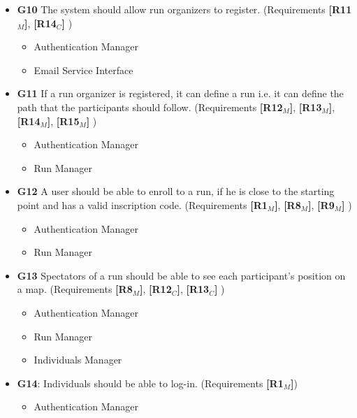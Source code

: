 \begin{itemize}
    
    \item \textbf{G10} The system should allow run organizers to register. \newline(Requirements \textbf{[R11$_M$]}, \textbf{[R14$_C$]} )
    \begin{itemize}
        \item Authentication Manager
        \item Email Service Interface
    \end{itemize}
    
    
    \item \textbf{G11} If a run organizer is registered, it can define a run i.e. it can define the path that the participants should follow. \newline(Requirements \textbf{[R12$_M$]}, \textbf{[R13$_M$]}, \textbf{[R14$_M$]}, \textbf{[R15$_M$]} )
    \begin{itemize}
        \item Authentication Manager
        \item Run Manager
    \end{itemize}
   
   
    \item \textbf{G12} A user should be able to enroll to a run, if he is close to the starting point and has a valid inscription code. \newline(Requirements \textbf{[R1$_M$]}, \textbf{[R8$_M$]},  \textbf{[R9$_M$]}  )
    \begin{itemize}
        \item Authentication Manager
        \item Run Manager
    \end{itemize}   
   
    \item \textbf{G13} Spectators of a run should be able to see each participant's position on a map. \newline(Requirements \textbf{[R8$_M$]}, \textbf{[R12$_C$]}, \textbf{[R13$_C$]} )
    \begin{itemize}
        \item Authentication Manager
        \item Run Manager
        \item Individuals Manager
    \end{itemize} 
   
    \item \textbf{G14}: Individuals should be able to log-in.
    \newline(Requirements \textbf{[R1$_M$]})
    \begin{itemize}
        \item Authentication Manager
    \end{itemize}
    

\end{itemize}
